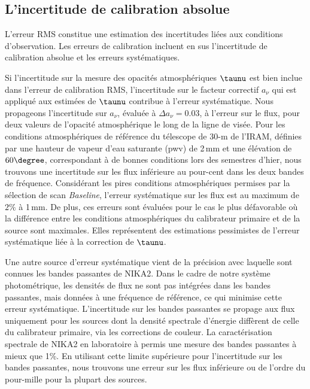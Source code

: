 \subsection{L'incertitude de calibration absolue}
\label{se:syste}

L'erreur RMS constitue une estimation des incertitudes liées
aux conditions d'observation. Les erreurs de calibration incluent en
sus l'incertitude de calibration absolue et les erreurs
systématiques.  

Si l'incertitude sur la mesure des opacités
atmosphériques $\taunu$ est bien inclue dans l'erreur de calibration
RMS, l'incertitude sur le facteur correctif $a_\nu$ qui est appliqué
aux estimées de $\taunu$ contribue à l'erreur systématique. Nous
propageons l'incertitude sur $a_\nu$, évaluée à $\Delta a_\nu = 0.03$,
à l'erreur sur le flux, pour deux valeurs de l'opacité atmosphérique
le long de la ligne de visée. Pour les conditions atmosphériques de
référence du télescope de 30-m de l'IRAM, définies par une hauteur
de vapeur d'eau saturante (pwv) de 2\,mm et une élévation de
$60\degree$, correspondant à de bonnes conditions lors des semestres
d'hier, nous trouvons une incertitude sur les flux inférieure au
pour-cent dans les deux bandes de fréquence. Considérant les pires
conditions atmosphériques permises par la sélection de scan
\emph{Baseline}, l'erreur systématique sur les flux est au maximum de
$2\%$ à 1\,mm. De plus, ces erreurs sont évaluées pour le cas le plus
défavorable où la différence entre les conditions atmosphériques du
calibrateur primaire et de la source sont maximales. Elles représentent
des estimations pessimistes de l'erreur systématique liée à la
correction de $\taunu$.

Une autre source d'erreur systématique vient de la précision avec
laquelle sont connues les bandes passantes de NIKA2. Dans le cadre de
notre système photométrique, les densités de flux ne sont pas
intégrées dans les bandes passantes, mais données à une
fréquence de référence, ce qui minimise cette erreur
systématique. L'incertitude sur les bandes passantes se propage aux
flux uniquement pour les sources dont la densité spectrale d'énergie
diffèrent de celle du calibrateur primaire, via les corrections de
couleur. La caractérisation spectrale de NIKA2 en laboratoire à permis
une mesure des bandes passantes à mieux que 1\%. En utilisant cette
limite supérieure pour l'incertitude sur les bandes passantes, nous
trouvons une erreur sur les flux inférieure ou de l'ordre du pour-mille
pour la plupart des sources. 

